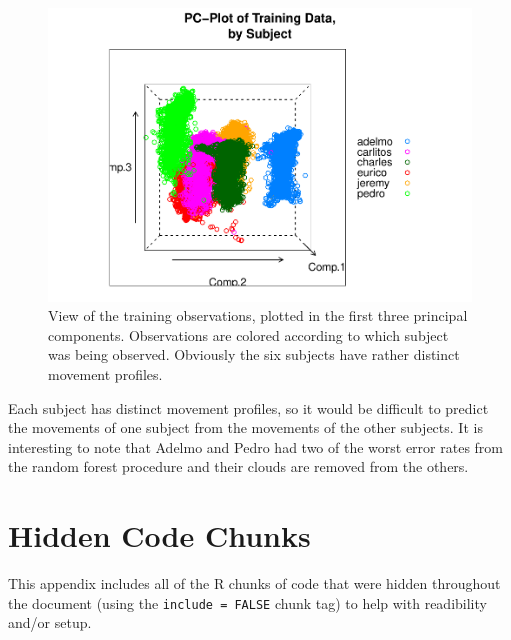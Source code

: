 \documentclass[12pt,twoside]{reedthesis}
\begin{document}
  \begin{figure}
  
  {\centering \includegraphics{A_Random_Forest_Model_for_Computer-Assisted_Activity-Recognition_files/figure-latex/unnamed-chunk-53-1} 
  
  }
  
  \caption[View of the training observations, plotted in the first three principal components]{View of the training observations, plotted in the first three principal components.  Observations are colored according to which subject was being observed.  Obviously the six subjects have rather distinct movement profiles.}\label{fig:unnamed-chunk-53}
  \end{figure}
  
  Each subject has distinct movement profiles, so it would be difficult to
  predict the movements of one subject from the movements of the other
  subjects. It is interesting to note that Adelmo and Pedro had two of the
  worst error rates from the random forest procedure and their clouds are
  removed from the others.
  
  \appendix
  
  \chapter{Hidden Code Chunks}\label{hidden-code-chunks}
  
  This appendix includes all of the R chunks of code that were hidden
  throughout the document (using the \texttt{include\ =\ FALSE} chunk tag)
  to help with readibility and/or setup.
  
  \begin{Shaded}
  \begin{Highlighting}[]
  
  \end{Highlighting}
  \end{Shaded}
  
\end{document}
